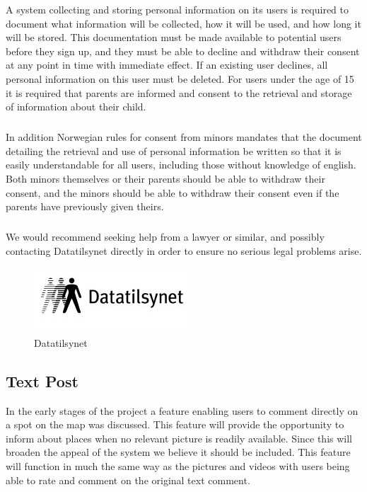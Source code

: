 A system collecting and storing personal information on its users is required to document what information will be collected, how it will be used, and how long it will be stored. This documentation must be made available to potential users before they sign up, and they must be able to decline and withdraw their consent at any point in time with immediate effect. If an existing user declines, all personal information on this user must be deleted. For users under the age of 15 it is required that parents are informed and consent to the retrieval and storage of information about their child.
\subparagraph{} In addition Norwegian rules for consent from minors mandates that the document detailing the retrieval and use of personal information be written so that it is easily understandable for all users, including those without knowledge of english. Both minors themselves or their parents should be able to withdraw their consent, and the minors should be able to withdraw their consent even if the parents have previously given theirs.
\subparagraph{} We would recommend seeking help from a lawyer or similar, and possibly contacting Datatilsynet directly in order to ensure no serious legal problems arise.

\begin{figure}[ht!]
  \centering
  \includegraphics[width=\linewidth]{./FurtherWork/img/Datatilsynet}
  \caption{Datatilsynet}
  \label{fig:FurtherDatatilsynetLogo}
\end{figure}

\subsection{Text Post}
\label{subsec:FurtherRequiredTextPost}
In the early stages of the project a feature enabling users to comment directly on a spot on the map was discussed. This feature will provide the opportunity to inform about places when no relevant picture is readily available. Since this will broaden the appeal of the system we believe it should be included. This feature will function in much the same way as the pictures and videos with users being able to rate and comment on the original text comment.

